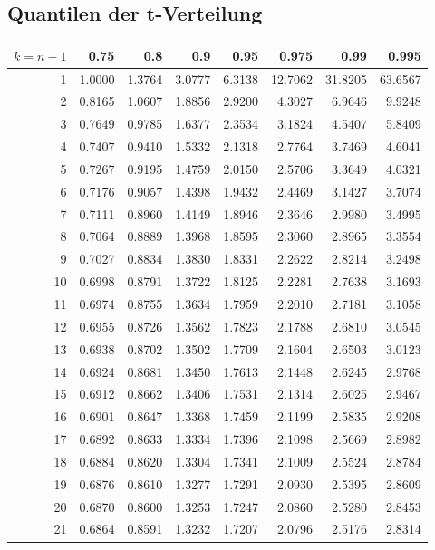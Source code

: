 	\subsection{Quantilen der t-Verteilung}
	\label{tabelle-quantilen-tvert}
	\begin{minipage}{\textwidth}
    	\centering
 \begin{tabular}{|r|rrrrrrr|}
\hline
$k = n-1$&0.75&0.8&0.9&0.95&0.975&0.99&0.995\\
\hline
\rowcolor[gray]{.9}
1&1.0000&1.3764&3.0777&6.3138&12.7062&31.8205&63.6567\\
2&0.8165&1.0607&1.8856&2.9200&4.3027&6.9646&9.9248\\
\rowcolor[gray]{.9}
3&0.7649&0.9785&1.6377&2.3534&3.1824&4.5407&5.8409\\
4&0.7407&0.9410&1.5332&2.1318&2.7764&3.7469&4.6041\\
\rowcolor[gray]{.9}
5&0.7267&0.9195&1.4759&2.0150&2.5706&3.3649&4.0321\\
6&0.7176&0.9057&1.4398&1.9432&2.4469&3.1427&3.7074\\
\rowcolor[gray]{.9}
7&0.7111&0.8960&1.4149&1.8946&2.3646&2.9980&3.4995\\
8&0.7064&0.8889&1.3968&1.8595&2.3060&2.8965&3.3554\\
\rowcolor[gray]{.9}
9&0.7027&0.8834&1.3830&1.8331&2.2622&2.8214&3.2498\\
10&0.6998&0.8791&1.3722&1.8125&2.2281&2.7638&3.1693\\
\rowcolor[gray]{.9}
11&0.6974&0.8755&1.3634&1.7959&2.2010&2.7181&3.1058\\
12&0.6955&0.8726&1.3562&1.7823&2.1788&2.6810&3.0545\\
\rowcolor[gray]{.9}
13&0.6938&0.8702&1.3502&1.7709&2.1604&2.6503&3.0123\\
14&0.6924&0.8681&1.3450&1.7613&2.1448&2.6245&2.9768\\
\rowcolor[gray]{.9}
15&0.6912&0.8662&1.3406&1.7531&2.1314&2.6025&2.9467\\
16&0.6901&0.8647&1.3368&1.7459&2.1199&2.5835&2.9208\\
\rowcolor[gray]{.9}
17&0.6892&0.8633&1.3334&1.7396&2.1098&2.5669&2.8982\\
18&0.6884&0.8620&1.3304&1.7341&2.1009&2.5524&2.8784\\
\rowcolor[gray]{.9}
19&0.6876&0.8610&1.3277&1.7291&2.0930&2.5395&2.8609\\
20&0.6870&0.8600&1.3253&1.7247&2.0860&2.5280&2.8453\\
\rowcolor[gray]{.9}
21&0.6864&0.8591&1.3232&1.7207&2.0796&2.5176&2.8314\\

\end{tabular}
\end{minipage}
